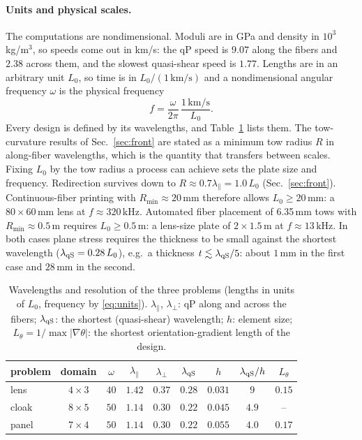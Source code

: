 \paragraph{Units and physical scales.} The computations are nondimensional. Moduli are in GPa and
density in $10^3$\,kg/m$^3$, so speeds come out in km/s: the qP speed is $9.07$ along the fibers and
$2.38$ across them, and the slowest quasi-shear speed is $1.77$. Lengths are in an arbitrary unit
$L_0$, so time is in $L_0/(1\,\mathrm{km/s})$ and a nondimensional angular frequency $\omega$ is the
physical frequency
\begin{equation}
f=\frac{\omega}{2\pi}\,\frac{1\,\mathrm{km/s}}{L_0}.
\label{eq:units}
\end{equation}
Every design is defined by its wavelengths, and Table~\ref{tab:scales} lists them. The tow-curvature
results of Sec.~\ref{sec:front} are stated as a minimum tow radius $R$ in along-fiber wavelengths, which
is the quantity that transfers between scales. Fixing $L_0$ by the tow radius a process can achieve sets
the plate size and frequency. Redirection survives down to $R\approx0.7\lambda_\parallel=1.0\,L_0$
(Sec.~\ref{sec:front}). Continuous-fiber printing with $R_{\min}\approx20\,\mathrm{mm}$ therefore allows
$L_0\ge20\,\mathrm{mm}$: a $80\times60$\,mm lens at $f\approx320\,\mathrm{kHz}$. Automated fiber
placement of 6.35\,mm tows with $R_{\min}\approx0.5\,\mathrm{m}$ requires $L_0\ge0.5\,\mathrm{m}$: a
lens-size plate of $2\times1.5$\,m at $f\approx13\,\mathrm{kHz}$. In both cases plane stress requires the
thickness to be small against the shortest wavelength ($\lambda_{\rm qS}=0.28\,L_0$), e.g.\ a thickness $t\lesssim\lambda_{\rm qS}/5$:
about $1$\,mm in the first case and $28$\,mm in the second.

\begin{table}[!tbp]
\centering\small
\caption{Wavelengths and resolution of the three problems (lengths in units of $L_0$, frequency by
\eqref{eq:units}). $\lambda_\parallel$, $\lambda_\perp$: qP along and across the fibers; $\lambda_{\rm qS}$: the shortest
(quasi-shear) wavelength; $h$: element size; $L_\theta=1/\max|\nabla\theta|$: the shortest
orientation-gradient length of the design.}
\label{tab:scales}
\begin{tabular}{@{}lcccccccc@{}}
\toprule
problem & domain & $\omega$ & $\lambda_\parallel$ & $\lambda_\perp$ & $\lambda_{\rm qS}$ & $h$ & $\lambda_{\rm qS}/h$ & $L_\theta$\\ \midrule
lens & $4\times3$ & $40$ & $1.42$ & $0.37$ & $0.28$ & $0.031$ & $9$ & $0.15$\\
cloak & $8\times5$ & $50$ & $1.14$ & $0.30$ & $0.22$ & $0.045$ & $4.9$ & --\\
panel & $7\times4$ & $50$ & $1.14$ & $0.30$ & $0.22$ & $0.055$ & $4.0$ & $0.17$\\
\bottomrule
\end{tabular}
\end{table}

